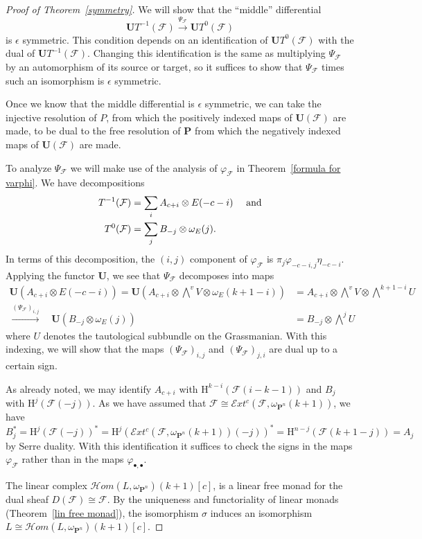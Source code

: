 \documentclass{jams-l}
\theoremstyle{definition}
\theoremstyle{remark}
\newcommand{\E} {{\mathcal E}}
\newcommand{\F}{{\mathcal F}}
\newcommand{\Hrm}{{\mathrm H}}
\newcommand{\cH}{{\mathcal H}}
\newcommand{\PP}{{\mathbf P}}
\newcommand{\UU}{{\mathbf U}}
\newcommand{\iso}{\cong}
\newcommand{\rTo}{\xrightarrow}
\begin{document}
\begin{proof}[Proof of Theorem~\ref{symmetry}]
We will show
that the
``middle'' differential
\[\UU T^{-1}(\F) \rTo{\Psi_\F} \UU T^0(\F)\]
is $\epsilon$ symmetric. This condition depends
on an identification of 
$\UU T^0(\F)$ with the dual of $\UU T^{-1}(\F)$. 
Changing this identification is the same as 
multiplying $\Psi_\F$ by an automorphism of
its source or target, so it suffices to show
that $\Psi_\F$ times such an isomorphism is
$\epsilon$ symmetric.

Once we know that the middle differential is
$\epsilon$ symmetric,
we can take the injective resolution
of $P$, from which the positively indexed maps of
$\UU(\F)$ are made, to be dual to the free resolution
of $\PP$ from which the negatively indexed maps of 
$\UU(\F)$ are made. 

To analyze $\Psi_\F$ we will make use of the analysis
of $\varphi_\F$ in Theorem~\ref{formula for varphi}.
We have decompositions
\begin{align*}
T^{-1}(\F)&=\sum_i A_{c+i}\otimes E(-c-i)\ \quad\text{\rm and}\\
T^{0}(\F)&=\sum_j B_{-j}\otimes \omega_E(j).
\end{align*}
In terms of this decomposition, the $(i,j)$ component
of $\varphi_\F$ is $\pi_j\varphi_{-c-i,j}\eta_{-c-i}$. 
Applying the functor $\UU$,
we see that $\Psi_\F$ decomposes into maps
\begin{align*}
\UU(A_{c+i}\otimes E(-c-i)) = 
\UU(A_{c+i}\otimes \bigwedge^vV \otimes \omega_E(k+1-i))  
&=A_{c+i}\otimes \bigwedge^vV \otimes \bigwedge^{k+1-i}U\\
\rTo{(\Psi_\F)_{i,j}}\quad
\UU(B_{-j}\otimes \omega_E(j))
&=B_{-j}\otimes \bigwedge^jU
\end{align*}
where $U$ denotes the tautological subbundle on the Grassmanian.
With this indexing, we will show that the maps $(\Psi_\F)_{i,j}$
and $(\Psi_\F)_{j,i}$ are dual up to a certain sign. 

As already noted, we may identify $A_{c+i}$ with
$\Hrm^{k-i}(\F(i-k-1))$
and $B_j$ with $\Hrm^j(\F(-j))$. As we have assumed that
$\F\iso \E xt^c(\F, \omega_{\PP^n}(k+1))$, we have
\[
B_j^*=\Hrm^j(\F(-j))^*
=\Hrm^{j}(\E xt^c(\F, \omega_{\PP^n}(k+1))(-j))^*
=\Hrm^{n-j}(\F(k+1-j))
=A_j
\]
by Serre duality. With this identification it suffices
to check the 
signs in the maps $\varphi_\F$ rather than in the maps
$\varphi_{\bullet,\bullet}$.

The linear complex
$\cH om(L,\omega_{\PP^n})(k+1)[c]$, is 
a linear free monad for the dual sheaf
$D(\F)\iso \F$. By the uniqueness and functoriality
of linear monads (Theorem~\ref{lin free monad}), the isomorphism $\sigma$ induces
an isomorphism
$L\iso \cH om(L,\omega_{\PP^n})(k+1)[c]$.


\end{proof}
\end{document}
